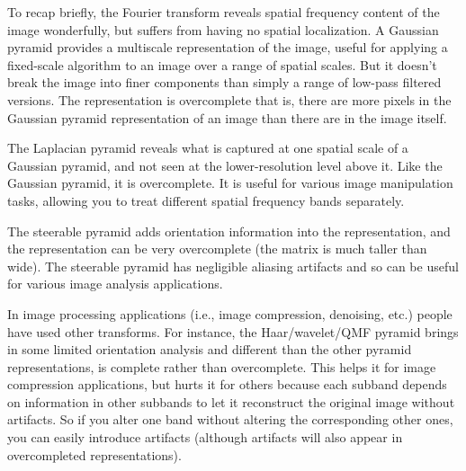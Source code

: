 To recap briefly, the Fourier transform reveals spatial frequency content of the image wonderfully, but suffers from having no spatial localization. A Gaussian pyramid provides a multiscale representation of the image, useful for applying a fixed-scale algorithm to an image over a range of spatial scales.  But it doesn't break the image into finer components than simply a range of low-pass filtered versions.  The representation is overcomplete that is, there are more pixels in the Gaussian pyramid representation of an image than there are in the image itself.

The Laplacian pyramid reveals what is captured at one spatial scale of a Gaussian pyramid, and not seen at the lower-resolution level above it.  Like the Gaussian pyramid, it is overcomplete. It is useful for various image manipulation tasks, allowing you to treat different spatial frequency bands separately.

The steerable pyramid adds orientation information into the representation, and the representation can be very overcomplete (the matrix is much taller than wide). The steerable pyramid has negligible aliasing artifacts and so can be useful for various image analysis applications.

In image processing applications (i.e., image compression, denoising, etc.) people have used other transforms. For instance, the Haar/wavelet/QMF pyramid \cite{Adelson87b} brings in some limited orientation analysis and different than the other pyramid representations, is complete rather than overcomplete.  This helps it for image compression applications, but hurts it for others because each subband depends on information in other subbands to let it reconstruct the original image without artifacts.  So if you alter one band without altering the corresponding other ones, you can easily introduce artifacts (although artifacts will also appear in overcompleted representations).



%







